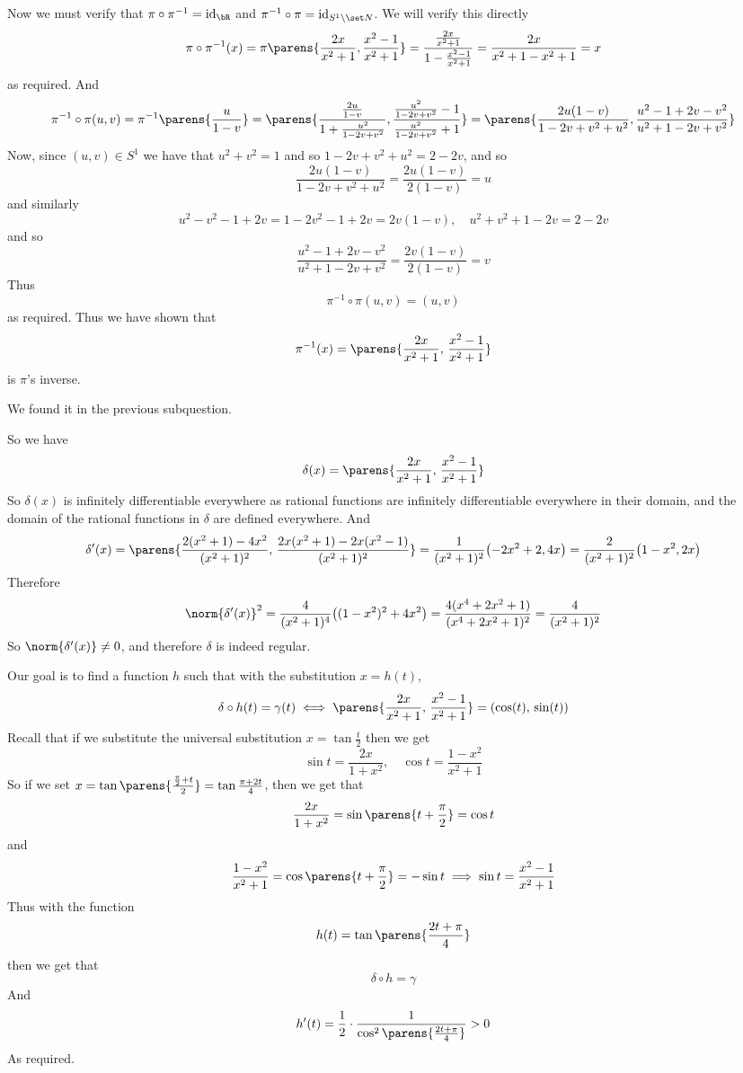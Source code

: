 \documentclass[10pt]{article}
\begin{document}
        Now we must verify that $\pi\circ\pi^{-1}=\mathrm{id}_\bR$ and $\pi^{-1}\circ\pi=\mathrm{id}_{S^1\setminus\set N}$.
        We will verify this directly
        \[ \pi\circ\pi^{-1}(x) = \pi\parens{\frac{2x}{x^2+1},\frac{x^2-1}{x^2+1}} = \frac{\frac{2x}{x^2+1}}{1-\frac{x^2-1}{x^2+1}} = \frac{2x}{x^2+1-x^2+1} = x \]
        as required.
        And
        \[ \pi^{-1}\circ\pi(u,v) = \pi^{-1}\parens{\frac u{1-v}} = \parens{\frac{\frac{2u}{1-v}}{1+\frac{u^2}{1-2v+v^2}}, \frac{\frac{u^2}{1-2v+v^2}-1}{\frac{u^2}{1-2v+v^2}+1}}
        = \parens{\frac{2u(1-v)}{1-2v+v^2+u^2}, \frac{u^2-1+2v-v^2}{u^2+1-2v+v^2}} \]
        Now, since $(u,v)\in S^1$ we have that $u^2+v^2=1$ and so $1-2v+v^2+u^2=2-2v$, and so
        \[ \frac{2u(1-v)}{1-2v+v^2+u^2} = \frac{2u(1-v)}{2(1-v)} = u \]
        and similarly
        \[ u^2-v^2-1+2v = 1-2v^2-1+2v = 2v(1-v),\quad u^2+v^2+1-2v = 2-2v \]
        and so
        \[ \frac{u^2-1+2v-v^2}{u^2+1-2v+v^2} = \frac{2v(1-v)}{2(1-v)} = v \]
        Thus
        \[ \pi^{-1}\circ\pi(u,v) = (u,v) \]
        as required.
        Thus we have shown that
        \[ \pi^{-1}(x) = \parens{\frac{2x}{x^2+1},\,\frac{x^2-1}{x^2+1}} \]
        is $\pi$'s inverse.

        \item We found it in the previous subquestion.

        \item So we have
        \[ \delta(x) = \parens{\frac{2x}{x^2+1},\,\frac{x^2-1}{x^2+1}} \]
        So $\delta(x)$ is infinitely differentiable everywhere as rational functions are infinitely differentiable everywhere in their domain, and the domain of the rational functions in $\delta$ are defined
        everywhere.
        And
        \[ \delta'(x) = \parens{\frac{2(x^2+1)-4x^2}{(x^2+1)^2},\,\frac{2x(x^2+1)-2x(x^2-1)}{(x^2+1)^2}} = \frac1{(x^2+1)^2}\bigl(-2x^2+2, 4x\bigr) = \frac2{(x^2+1)^2}\bigl(1-x^2,2x\bigr) \]
        Therefore
        \[ \norm{\delta'(x)}^2 = \frac4{(x^2+1)^4}\bigl((1-x^2)^2+4x^2\bigr) = \frac{4(x^4+2x^2+1)}{(x^4+2x^2+1)^2} = \frac4{(x^2+1)^2} \]
        So $\norm{\delta'(x)}\neq0$, and therefore $\delta$ is indeed regular.

        \item Our goal is to find a function $h$ such that with the substitution $x=h(t)$,
        \[ \delta\circ h(t) = \gamma(t) \iff \parens{\frac{2x}{x^2+1},\,\frac{x^2-1}{x^2+1}} = (\cos(t),\,\sin(t)) \]
        Recall that if we substitute the universal substitution $x=\tan\frac t2$ then we get
        \[ \sin t =\frac{2x}{1+x^2},\quad \cos t=\frac{1-x^2}{x^2+1} \]
        So if we set $x=\tan\parens{\frac{\frac\pi2+t}2}=\tan\frac{\pi+2t}4$, then we get that
        \[ \frac{2x}{1+x^2} = \sin\parens{t+\frac\pi2} = \cos t \]
        and
        \[ \frac{1-x^2}{x^2+1} = \cos\parens{t+\frac\pi2} = -\sin t \implies \sin t = \frac{x^2-1}{x^2+1} \]
        Thus with the function
        \[ h(t) = \tan\parens{\frac{2t+\pi}4} \]
        then we get that
        \[ \delta\circ h = \gamma \]
        And
        \[ h'(t) = \frac12\cdot\frac1{\cos^2\parens{\frac{2t+\pi}4}} > 0 \]
        As required.
\end{document}
